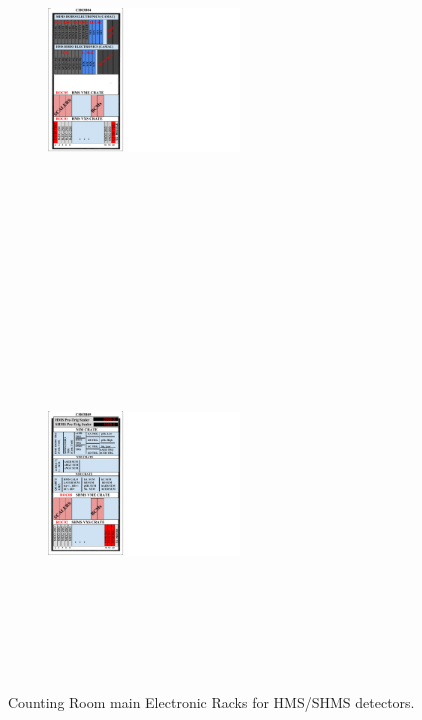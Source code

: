 \documentclass[11pt]{article}
\begin{document}
\newpage

\begin{figure}[h!]
\centering
\begin{subfigure}{.3\textwidth}
  \centering
  \includegraphics[width=2.0in, height=4.0in]{CR_rack4.pdf}
\end{subfigure}%
\begin{subfigure}{.2\textwidth}
  \centering
  \includegraphics[width=2.0in, height=4.0in]{CR_rack5.pdf}
\end{subfigure}
\caption{Counting Room main Electronic Racks for HMS/SHMS detectors.}
\label{fig:cr_racks}
\end{figure}
\end{document}
